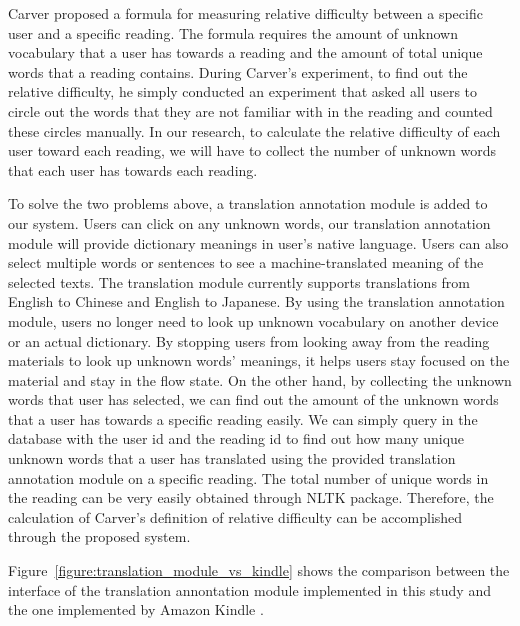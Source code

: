 Carver \cite{Carver1994} proposed a formula for measuring relative difficulty between a specific user and a specific reading. The formula requires the amount of unknown vocabulary that a user has towards a reading and the amount of total unique words that a reading contains. During Carver's experiment, to find out the relative difficulty, he simply conducted an experiment that asked all users to circle out the words that they are not familiar with in the reading and counted these circles manually. In our research, to calculate the relative difficulty of each user toward each reading, we will have to collect the number of unknown words that each user has towards each reading. 

To solve the two problems above, a translation annotation module is added to our system. Users can click on any unknown words, our translation annotation module will provide dictionary meanings in user's native language. Users can also select multiple words or sentences to see a machine-translated meaning of the selected texts. The translation module currently supports translations from English to Chinese and English to Japanese. By using the translation annotation module, users no longer need to look up unknown vocabulary on another device or an actual dictionary. By stopping users from looking away from the reading materials to look up unknown words' meanings, it helps users stay focused on the material and stay in the flow state. On the other hand, by collecting the unknown words that user has selected, we can find out the amount of the unknown words that a user has towards a specific reading easily. We can simply query in the database with the user id and the reading id to find out how many unique unknown words that a user has translated using the provided translation annotation module on a specific reading. The total number of unique words in the reading can be very easily obtained through NLTK package. Therefore, the calculation of Carver's definition of relative difficulty can be accomplished through the proposed system. 

Figure~\ref{figure:translation_module_vs_kindle} shows the comparison between the interface of the translation annontation module implemented in this study and the one implemented by Amazon Kindle \cite{Kindle}.

